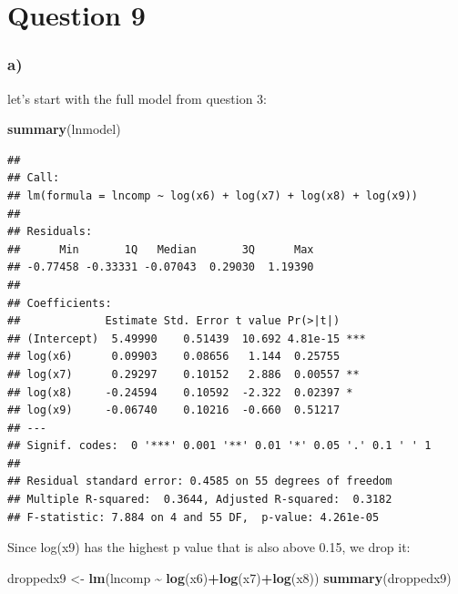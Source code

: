 \documentclass[
]{article}
\newenvironment{Shaded}{\begin{snugshade}}{\end{snugshade}}
\newcommand{\FunctionTok}[1]{\textcolor[rgb]{0.13,0.29,0.53}{\textbf{#1}}}
\newcommand{\NormalTok}[1]{#1}
\newcommand{\OtherTok}[1]{\textcolor[rgb]{0.56,0.35,0.01}{#1}}
\newcommand{\SpecialCharTok}[1]{\textcolor[rgb]{0.81,0.36,0.00}{\textbf{#1}}}
\begin{document}
\section{Question 9}\label{question-9}

\subsubsection{a)}\label{a-2}

let's start with the full model from question 3:

\begin{Shaded}
\begin{Highlighting}[]
\FunctionTok{summary}\NormalTok{(lnmodel)}
\end{Highlighting}
\end{Shaded}

\begin{verbatim}
## 
## Call:
## lm(formula = lncomp ~ log(x6) + log(x7) + log(x8) + log(x9))
## 
## Residuals:
##      Min       1Q   Median       3Q      Max 
## -0.77458 -0.33331 -0.07043  0.29030  1.19390 
## 
## Coefficients:
##             Estimate Std. Error t value Pr(>|t|)    
## (Intercept)  5.49990    0.51439  10.692 4.81e-15 ***
## log(x6)      0.09903    0.08656   1.144  0.25755    
## log(x7)      0.29297    0.10152   2.886  0.00557 ** 
## log(x8)     -0.24594    0.10592  -2.322  0.02397 *  
## log(x9)     -0.06740    0.10216  -0.660  0.51217    
## ---
## Signif. codes:  0 '***' 0.001 '**' 0.01 '*' 0.05 '.' 0.1 ' ' 1
## 
## Residual standard error: 0.4585 on 55 degrees of freedom
## Multiple R-squared:  0.3644, Adjusted R-squared:  0.3182 
## F-statistic: 7.884 on 4 and 55 DF,  p-value: 4.261e-05
\end{verbatim}

Since log(x9) has the highest p value that is also above 0.15, we drop
it:

\begin{Shaded}
\begin{Highlighting}[]
\NormalTok{droppedx9 }\OtherTok{\textless{}{-}} \FunctionTok{lm}\NormalTok{(lncomp }\SpecialCharTok{\textasciitilde{}} \FunctionTok{log}\NormalTok{(x6)}\SpecialCharTok{+}\FunctionTok{log}\NormalTok{(x7)}\SpecialCharTok{+}\FunctionTok{log}\NormalTok{(x8))}
\FunctionTok{summary}\NormalTok{(droppedx9)}
\end{Highlighting}
\end{Shaded}
\end{document}
